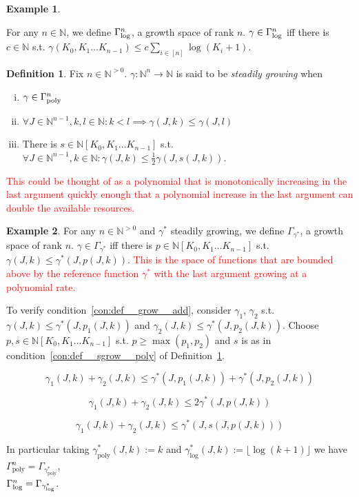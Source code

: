 \documentclass[11pt]{article}
\numberwithin{equation}{section}
\theoremstyle{definition}
\newtheorem{definition}{Definition}[section]
\newtheorem{example}{Example}[section]
\theoremstyle{plain}
\newcommand{\Nats}{\mathbb{N}}
\newcommand{\NatPoly}{\Nats[K_0, K_1 \ldots K_{n-1}]}
\newcommand{\NatFun}{\Nats^n \rightarrow}
\newcommand{\Floor}[1]{\lfloor #1 \rfloor}
\newcommand{\GammaPoly}{\Gamma_{\textnormal{poly}}}
\newcommand{\GammaLog}{\Gamma_{\textnormal{log}}}
\begin{document}
\begin{example}
\label{exm:gamma_log}

For any $n \in \Nats$, we define $\GammaLog^n$, a growth space of rank $n$. $\gamma \in \GammaLog^n$ iff there is $c \in \Nats$ s.t. $\gamma(K_0, K_1 \ldots K_{n-1}) \leq c \sum_{i \in [n]} \log(K_i+1)$.

\end{example}

\begin{samepage}
\begin{definition}
\label{def:sgrow}
Fix ${n \in \Nats^{>0}}$. ${\gamma: \NatFun \Nats}$ is said to be \emph{steadily growing} when
\begin{enumerate}[(i)]
\item ${\gamma \in \GammaPoly^n}$
\item ${\forall J \in \Nats^{n-1}, k,l \in \Nats: k < l \implies \gamma(J,k) \leq \gamma(J,l)}$
\item\label{con:def__sgrow__poly} There is ${s \in \NatPoly}$ s.t. ${\forall J \in \Nats^{n-1}, k \in \Nats: \gamma(J,k) \leq \frac{1}{2}\gamma(J,s(J,k))}$.
\end{enumerate}
\end{definition}
\textcolor{red}{This could be thought of as a polynomial that is monotonically increasing in the last argument quickly enough that a polynomial increase in the last argument can double the available resources.}
\end{samepage}

\begin{samepage}
\begin{example}

For any ${n \in \Nats^{>0}}$ and ${\gamma^*}$ steadily growing, we define ${\Gamma_{\gamma^*}}$, a growth space of rank ${n}$. ${\gamma \in \Gamma_{\gamma^*}}$ iff there is ${p \in \NatPoly}$ s.t. ${\gamma(J,k) \leq \gamma^*(J,p(J,k))}$. \textcolor{red}{This is the space of functions that are bounded above by the reference function ${\gamma^*}$ with the last argument growing at a polynomial rate.}

To verify condition~\ref{con:def__grow__add}, consider ${\gamma_1}$, ${\gamma_2}$ s.t. ${\gamma(J,k) \leq \gamma^*(J,p_1(J,k))}$ and ${\gamma_2(J,k) \leq \gamma^*(J,p_2(J,k))}$. Choose ${p,s \in \NatPoly}$ s.t. ${p \geq \max(p_1,p_2)}$ and ${s}$ is as in condition~\ref{con:def__sgrow__poly} of Definition~\ref{def:sgrow}.

\[\gamma_1(J,k)+\gamma_2(J,k) \leq \gamma^*(J,p_1(J,k))+\gamma^*(J,p_2(J,k))\]

\[\gamma_1(J,k)+\gamma_2(J,k) \leq 2\gamma^*(J,p(J,k))\]

\[\gamma_1(J,k)+\gamma_2(J,k) \leq \gamma^*(J,s(J,p(J,k)))\]

In particular taking ${\gamma^*_{\text{poly}}(J,k):=k}$ and ${\gamma^*_{\text{log}}(J,k):=\Floor{\log (k+1)}}$ we have ${\Gamma_{\text{poly}}^n=\Gamma_{\gamma^*_{\text{poly}}}}$,\\ $\GammaLog^n=\Gamma_{\gamma^*_{\text{log}}}$.

\end{example}
\end{samepage}
\end{document}
